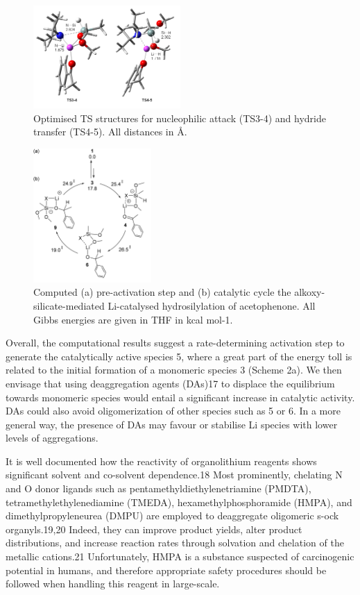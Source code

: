 \documentclass[journal=jacsat,manuscript=article]{achemso}
\begin{document}
	\begin{figure}[H]
	\includegraphics[width=0.5\textwidth]{figures/Nucleophilic attack.PNG}	
	\centering
	\caption{Optimised TS structures for nucleophilic attack (TS3-4) and hydride transfer (TS4-5). All distances in \si{\angstrom}.}
	\label{Figure1}
	\end{figure}	

	\begin{figure}[H]
	\includegraphics[width=0.4\textwidth]{figures/Cycle.PNG}		
	\centering
	\caption{Computed (a) pre-activation step and (b) catalytic cycle the alkoxy-silicate-mediated Li-catalysed hydrosilylation of acetophenone. All Gibbs energies are given in THF in kcal mol-1.}
	\label{Scheme 3}
	\end{figure}	

	Overall, the computational results suggest a rate-determining activation step to generate the catalytically active species 5, where a great part of the energy toll is related to the initial formation of a monomeric species 3 (Scheme 2a). We then envisage that using deaggregation agents (DAs)17 to displace the equilibrium towards monomeric species would entail a significant	increase in catalytic activity. DAs could also avoid oligomerization of other species such as 5 or 6. In a more general	way, the presence of DAs may favour or stabilise Li species	with lower levels of aggregations. 

	It is well documented how the reactivity of organolithium reagents shows significant solvent and co-solvent dependence.18 Most prominently, chelating N and O donor ligands such as pentamethyldiethylenetriamine (PMDTA), tetramethylethylenediamine 	(TMEDA), hexamethylphosphoramide (HMPA), and dimethylpropyleneurea (DMPU) are employed to deaggregate oligomeric s-ock organyls.19,20 Indeed, they can improve product yields, alter product distributions, and increase reaction rates through solvation and chelation of the metallic cations.21 Unfortunately, HMPA is a substance suspected	of carcinogenic potential in humans, and therefore appropriate safety procedures should be followed when handling this reagent in large-scale. 
\end{document}
